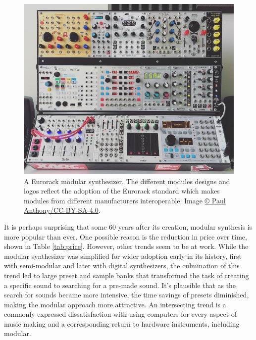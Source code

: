 \documentclass[
]{book}
\begin{document}
\begin{figure}
\includegraphics[width=1\linewidth]{images/Eurorack_Modular_Synthesizer-cropped} \caption{A Eurorack modular synthesizer. The different modules designs and logos reflect the adoption of the Eurorack standard which makes modules from different manufacturers interoperable. Image \href{https://commons.wikimedia.org/wiki/File:Eurorack_Modular_Synthesizer.jpg}{© Paul Anthony/CC-BY-SA-4.0}.}\label{fig:eurorack}
\end{figure}

It is perhaps surprising that some 60 years after its creation, modular synthesis is more popular than ever.
One possible reason is the reduction in price over time, shown in Table \ref{tab:price}.
However, other trends seem to be at work.
While the modular synthesizer was simplified for wider adoption early in its history, first with semi-modular and later with digital synthesizers, the culmination of this trend led to large preset and sample banks that transformed the task of creating a specific sound to searching for a pre-made sound.
It's plausible that as the search for sounds became more intensive, the time savings of presets diminished, making the modular approach more attractive.
An intersecting trend is a commonly-expressed dissatisfaction with using computers for every aspect of music making and a corresponding return to hardware instruments, including modular.
\end{document}

